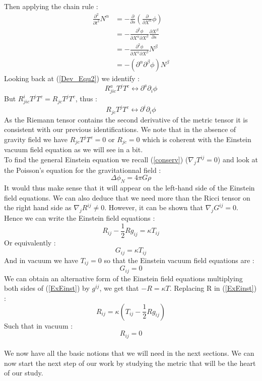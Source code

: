 \documentclass[a4paper,12pt]{article}
\theoremstyle{definition}
\begin{document}
Then applying the chain rule :
\begin{equation}
\begin{split}
	\frac{\partial^2}{\partial t^2}N^\alpha&=-\frac{\partial}{\partial s}(\frac{\partial}{\partial X^\alpha}\phi)\\
	&=-\frac{\partial^2\phi}{\partial X^\alpha\partial X^\beta}\frac{\partial X^\beta}{\partial s}\\
	&=-\frac{\partial^2\phi}{\partial X^\alpha\partial X^\beta}N^\beta\\
	&=-(\partial^\alpha \partial^\beta \phi)N^\beta
\end{split}
\end{equation}
Looking back at (\ref{Dev_Equ2}) we identify :
\begin{equation}
	R_{jic}^aT^jT^c\longleftrightarrow \partial^a \partial_i \phi
\end{equation}
But $R_{jic}^iT^jT^c=R_{jc}T^jT^c$, thus :
\begin{equation}
	R_{jc}T^jT^c\longleftrightarrow \partial^i \partial_i \phi
\end{equation}
As the Riemann tensor contains the second derivative of the metric tensor it is consistent with our previous identifications.
We note that in the absence of gravity field we have $R_{jc}T^jT^c=0$ or $R_{jc}=0$ which is coherent with the Einstein vacuum field equation as we will see in a bit.\\
To find the general Einstein equation we recall (\ref{conserv}) ($\nabla_j T^{ij}=0$) and look at the Poisson's equation for the gravitationnal field :
\begin{equation}
	\Delta\phi_N=4\pi G\rho
\end{equation}
It would thus make sense that it will appear on the left-hand side of the Einstein field equations.
We can also deduce that we need more than the Ricci tensor on the right hand side as $\nabla_j R^{ij}\ne0$.
However, it can be shown that $\nabla_j G^{ij}=0$.
Hence we can write the Einstein field equations :
\begin{equation}\label{ExEinst}
	R_{ij}-\frac{1}{2}Rg_{ij}=\kappa T_{ij}
\end{equation}
Or equivalently :
\begin{equation}
	G_{ij}=\kappa T_{ij}
\end{equation}
And in vacuum we have $T_{ij}=0$ so that the Einstein vacuum field equations are :
\begin{equation}
	G_{ij}=0
\end{equation}
We can obtain an alternative form of the Einstein field equations multiplying both sides of (\ref{ExEinst}) by $g^{ij}$, we get that $-R=\kappa T$.
Replacing R in (\ref{ExEinst}) :
\begin{equation}
	R_{ij}=\kappa(T_{ij}-\frac{1}{2}Rg_{ij})
\end{equation}
Such that in vacuum :
\begin{equation}
	R_{ij}=0
\end{equation}
\\We now have all the basic notions that we will need in the next sections.
We can now start the next step of our work by studying the metric that will be the heart of our study.
\end{document}

